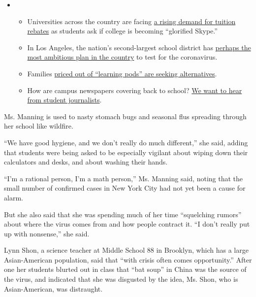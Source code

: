 \begin{itemize}
\item
  \begin{itemize}
  \tightlist
  \item
    Universities across the country are facing
    \href{https://www.nytimes.com/2020/08/15/us/covid-college-tuition.html?action=click\&pgtype=Article\&state=default\&region=MAIN_CONTENT_3\&context=storylines_keepup}{a
    rising demand for tuition rebates} as students ask if college is
    becoming ``glorified Skype.''
  \item
    In Los Angeles, the nation's second-largest school district has
    \href{https://www.nytimes.com/2020/08/16/us/los-angeles-schools-virus-testing.html?action=click\&pgtype=Article\&state=default\&region=MAIN_CONTENT_3\&context=storylines_keepup}{perhaps
    the most ambitious plan in the country} to test for the coronavirus.
  \item
    Families
    \href{https://www.nytimes.com/2020/08/14/us/covid-schools-learning-pods.html?action=click\&pgtype=Article\&state=default\&region=MAIN_CONTENT_3\&context=storylines_keepup}{priced
    out of ``learning pods'' are seeking alternatives}.
  \item
    How are campus newspapers covering back to school?
    \href{https://www.nytimes.com/2020/08/17/us/student-newspaper-schools-reopening.html?action=click\&pgtype=Article\&state=default\&region=MAIN_CONTENT_3\&context=storylines_keepup}{We
    want to hear from student journalists}.
  \end{itemize}
\end{itemize}

Ms. Manning is used to nasty stomach bugs and seasonal flus spreading
through her school like wildfire.

``We have good hygiene, and we don't really do much different,'' she
said, adding that students were being asked to be especially vigilant
about wiping down their calculators and desks, and about washing their
hands.

``I'm a rational person, I'm a math person,'' Ms. Manning said, noting
that the small number of confirmed cases in New York City had not yet
been a cause for alarm.

But she also said that she was spending much of her time ``squelching
rumors'' about where the virus comes from and how people contract it.
``I don't really put up with nonsense,'' she said.

Lynn Shon, a science teacher at Middle School 88 in Brooklyn, which has
a large Asian-American population, said that ``with crisis often comes
opportunity.'' After one her students blurted out in class that ``bat
soup'' in China was the source of the virus, and indicated that she was
disgusted by the idea, Ms. Shon, who is Asian-American, was distraught.

